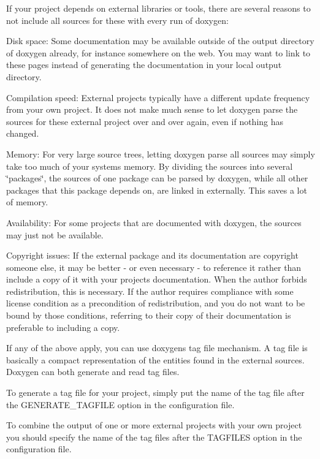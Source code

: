 If your project depends on external libraries or tools, there are several reasons to not include all sources for these with every run of doxygen\+:


\begin{DoxyDescription}
\item[Disk space\+:]Some documentation may be available outside of the output directory of doxygen already, for instance somewhere on the web. You may want to link to these pages instead of generating the documentation in your local output directory. 
\item[Compilation speed\+:]External projects typically have a different update frequency from your own project. It does not make much sense to let doxygen parse the sources for these external project over and over again, even if nothing has changed. 
\item[Memory\+:]For very large source trees, letting doxygen parse all sources may simply take too much of your system\textquotesingle{}s memory. By dividing the sources into several \char`\"{}packages\char`\"{}, the sources of one package can be parsed by doxygen, while all other packages that this package depends on, are linked in externally. This saves a lot of memory. 
\item[Availability\+:]For some projects that are documented with doxygen, the sources may just not be available. 
\item[Copyright issues\+:]If the external package and its documentation are copyright someone else, it may be better -\/ or even necessary -\/ to reference it rather than include a copy of it with your project\textquotesingle{}s documentation. When the author forbids redistribution, this is necessary. If the author requires compliance with some license condition as a precondition of redistribution, and you do not want to be bound by those conditions, referring to their copy of their documentation is preferable to including a copy.


\end{DoxyDescription}

If any of the above apply, you can use doxygen\textquotesingle{}s tag file mechanism. A tag file is basically a compact representation of the entities found in the external sources. Doxygen can both generate and read tag files.

To generate a tag file for your project, simply put the name of the tag file after the GENERATE\+\_\+\+TAGFILE option in the configuration file.

To combine the output of one or more external projects with your own project you should specify the name of the tag files after the TAGFILES option in the configuration file.

